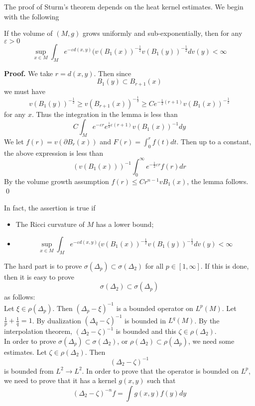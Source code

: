 The proof of Sturm's theorem depends on the heat kernel estimates. We begin
with the following
\begin{lemma}
If the volume of $(M,g)$ grows uniformly and sub-exponentially, then for any
$\varepsilon > 0$
\[
\sup_{x\in M}\int_M e^{-\varepsilon 
d(x,y)}(v(B_1(x))^{-\frac{1}{2}}v(B_1(y))^{-\frac{1}{2}} dv(y) < \infty
\]
\end{lemma}
{\bf Proof.}
We take $r = d(x,y)$. Then since
\[
B_1(y) \subset B_{r+1}(x)
\]
we must have
\[
v(B_1(y))^{-\frac{1}{2}} \geqslant v(B_{r+1}(x))^{-\frac{1}{2}} \geqslant
Ce^{-\frac{1}{2}(r+1)}v(B_1(x))^{-\frac{1}{2}}
\]
for any $x$. Thus the integration in the lemma is less than
\[
C\int_M e^{-\varepsilon r}e^{\frac{1}{2}\varepsilon(r+1)} v(B_1(x))^{-1} dy
\]
We let $f(r) = v(\partial B_r(x))$ and $F(r) = \int_0^r f(t)dt$. Then up to a
constant, the above expression is less than
\[
(v(B_1(x)))^{-1} \int_0^\infty e^{-\frac{1}{2}\varepsilon r} f(r)dr
\]
By the volume growth assumption $f(r) \leqslant Cr^{n-1} v B_1(x)$, the lemma
follows.
\qed

In fact, the assertion is true if
\begin{itemize}
\item[\ding{172}] The Ricci curvature of $M$ has a lower bound;
\item[\ding{173}] \[
\sup_{x\in M} \int_M e^{-\varepsilon d(x,y)}(v(B_1(x))^{-\frac{1}{2}}
v(B_1(y))^{-\frac{1}{2}} dv(y) < \infty
\]
\end{itemize}

The hard part is to prove $\sigma(\Delta_p) \subset \sigma(\Delta_2)$ for all
$p\in[1,\infty]$. If this is done, then it is easy to prove
\[
\sigma(\Delta_2) \subset \sigma(\Delta_p)
\]
as follows:
\\

Let $\xi\in\rho(\Delta_p)$. Then $(\Delta_p - \xi)^{-1}$ is a bounded operator
on $L^p(M)$. Let $\frac{1}{p} + \frac{1}{q} = 1$. By dualization 
$(\Delta_q - \zeta)^{-1}$ is bounded in $L^q(M)$. By the interpolation theorem,
$(\Delta_2 - \zeta)^{-1}$ is bounded and this $\zeta\in\rho(\Delta_2)$.
\\

In order to prove $\sigma(\Delta_p)\subset\sigma(\Delta_2)$, or 
$\rho(\Delta_2)\subset\rho(\Delta_p)$, we need some estimates. Let 
$\zeta\in\rho(\Delta_2)$. Then
\[
(\Delta_2 - \zeta)^{-1}
\]
is bounded from $L^2 \rightarrow L^2$. In order to prove that the operator is
bounded on $L^p$, we need to prove that it has a kernel $g(x,y)$ such that
\[
(\Delta_2 - \zeta)^{-n} f = \int g(x,y)f(y)dy
\]

